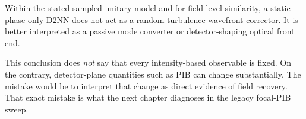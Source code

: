 \begin{discovery}
Within the stated sampled unitary model and for field-level similarity, a
static phase-only D2NN does not act as a random-turbulence wavefront corrector.
It is better interpreted as a passive mode converter or detector-shaping optical
front end.
\end{discovery}

This conclusion does \emph{not} say that every intensity-based observable is
fixed. On the contrary, detector-plane quantities such as PIB can change
substantially. The mistake would be to interpret that change as direct evidence
of field recovery. That exact mistake is what the next chapter diagnoses in the
legacy focal-PIB sweep.
